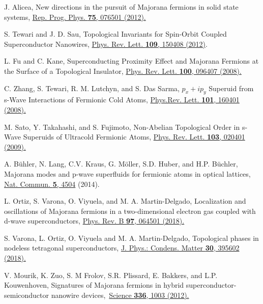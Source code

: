 \documentclass[twocolumn,prl,floatfix,citeautoscript,nofootinbib,superscriptaddress]{revtex4}
\begin{document}
\begin{thebibliography}{99}
 J. Alicea, New directions in the pursuit of Majorana
fermions in solid state systems, \href{https://doi.org/10.1088/0034-4885/75/7/076501}%
{Rep. Prog. Phys. \textbf{75}, 076501 (2012).}

 S. Tewari and J. D. Sau, Topological Invariants for
Spin-Orbit Coupled Superconductor Nanowires, \href{https://doi.org/10.1103/PhysRevLett.109.150408}%
{Phys. Rev. Lett. \textbf{109}, 150408 (2012)}.

 L. Fu and C. Kane, Superconducting Proximity Effect and
Majorana Fermions at the Surface of a Topological Insulator, \href{http://dx.doi.org/10.1103/PhysRevLett.100.096407}%
{Phys. Rev. Lett. \textbf{100}, 096407 (2008).}

 C. Zhang, S. Tewari, R. M. Lutchyn, and S. Das Sarma, $%
p_{x}+ip_{y}$ Superuid from s-Wave Interactions of Fermionic Cold Atoms,
\href{https://doi.org/10.1103/PhysRevLett.101.160401}{Phys.Rev. Lett.
\textbf{101}, 160401 (2008).}

 M. Sato, Y. Takahashi, and S. Fujimoto, Non-Abelian
Topological Order in s-Wave Superuids of Ultracold Fermionic Atoms, \href{https://doi.org/10.1103/PhysRevLett.103.020401}%
{Phys. Rev. Lett. \textbf{103}, 020401 (2009).}

 A. B\"{u}hler, N. Lang, C.V. Kraus, G. M\"{o}ller, S.D.
Huber, and H.P. B\"{u}chler, Majorana modes and p-wave superfluids for
fermionic atoms in optical lattices, \href{http://dx.doi.org/10.1038/ncomms5504}%
{Nat. Commun. \textbf{5}, 4504} (2014).

 L. Ortiz, S. Varona, O. Viyuela, and M. A.
Martin-Delgado, Localization and oscillations of Majorana fermions in a
two-dimensional electron gas coupled with d-wave superconductors, \href{https://doi.org/10.1103/PhysRevB.97.064501}%
{Phys. Rev. B \textbf{97}, 064501 (2018).}

 S. Varona, L. Ortiz, O. Viyuela and M. A.
Martin-Delgado, Topological phases in nodeless tetragonal superconductors,
\href{https://doi.org/10.1088/1361-648X/aadc71}{J. Phys.: Condens. Matter
\textbf{30}, 395602 (2018).}

 V. Mourik, K. Zuo, S. M Frolov, S.R. Plissard, E.
Bakkers, and L.P. Kouwenhoven, Signatures of Majorana fermions in hybrid
superconductor-semiconductor nanowire devices,\ \href{http://science.sciencemag.org/content/336/6084/1003}%
{Science \textbf{336}, 1003 (2012).}


\end{thebibliography}
\end{document}
